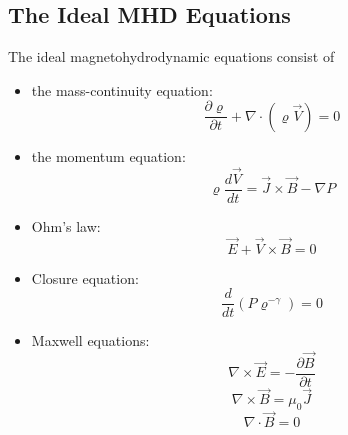 \subsection{The Ideal MHD Equations}
\label{subsec: The ideal MHD equations}
The ideal magnetohydrodynamic equations consist of
\begin{itemize}
    \item the mass-continuity equation:
            \begin{equation*}
                \label{eq: MHD mass continuity eq}
                \frac{\partial\varrho}{\partial t} + \nabla\cdot(\varrho \vec{V}) = 0
            \end{equation*}
    \item the momentum equation:
            \begin{equation}
                \label{eq: MHD momentum eq.}
                \varrho \frac{d \vec{V}}{dt} = \vec{J} \times \vec{B} - \nabla P
            \end{equation}
    \item Ohm's law:
            \begin{equation}
                \vec{E} + \vec{V} \times \vec{B} = 0
                \label{eq: MHD ohm's law}
            \end{equation}
    \item Closure equation:
            \begin{equation*}
                \label{eq: MHD closure eq}
                \frac{d}{dt}\left(P \varrho^{-\gamma}\right) = 0
            \end{equation*}
    \item Maxwell equations:
            \begin{equation}
                \label{eq: MHD faraday}
                \nabla\times\vec{E} = - \frac{\partial \vec{B}}{\partial t}
            \end{equation}
            \begin{equation}
                \nabla\times\vec{B} =  \mu_0 \vec{J}
                \label{eq: MHD ampere-maxwell}
            \end{equation}
            \begin{equation*}
                \label{eq: MHD gauss law for magnetism}
                \nabla\cdot\vec{B} = 0
            \end{equation*}
\end{itemize}
